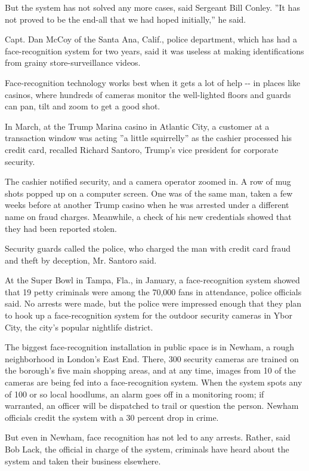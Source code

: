 But the system has not solved any more cases, said Sergeant Bill Conley.
''It has not proved to be the end-all that we had hoped initially,'' he
said.

Capt. Dan McCoy of the Santa Ana, Calif., police department, which has
had a face-recognition system for two years, said it was useless at
making identifications from grainy store-surveillance videos.

Face-recognition technology works best when it gets a lot of help -\/-
in places like casinos, where hundreds of cameras monitor the
well-lighted floors and guards can pan, tilt and zoom to get a good
shot.

In March, at the Trump Marina casino in Atlantic City, a customer at a
transaction window was acting ''a little squirrelly'' as the cashier
processed his credit card, recalled Richard Santoro, Trump's vice
president for corporate security.

The cashier notified security, and a camera operator zoomed in. A row of
mug shots popped up on a computer screen. One was of the same man, taken
a few weeks before at another Trump casino when he was arrested under a
different name on fraud charges. Meanwhile, a check of his new
credentials showed that they had been reported stolen.

Security guards called the police, who charged the man with credit card
fraud and theft by deception, Mr. Santoro said.

At the Super Bowl in Tampa, Fla., in January, a face-recognition system
showed that 19 petty criminals were among the 70,000 fans in attendance,
police officials said. No arrests were made, but the police were
impressed enough that they plan to hook up a face-recognition system for
the outdoor security cameras in Ybor City, the city's popular nightlife
district.

The biggest face-recognition installation in public space is in Newham,
a rough neighborhood in London's East End. There, 300 security cameras
are trained on the borough's five main shopping areas, and at any time,
images from 10 of the cameras are being fed into a face-recognition
system. When the system spots any of 100 or so local hoodlums, an alarm
goes off in a monitoring room; if warranted, an officer will be
dispatched to trail or question the person. Newham officials credit the
system with a 30 percent drop in crime.

But even in Newham, face recognition has not led to any arrests. Rather,
said Bob Lack, the official in charge of the system, criminals have
heard about the system and taken their business elsewhere.

